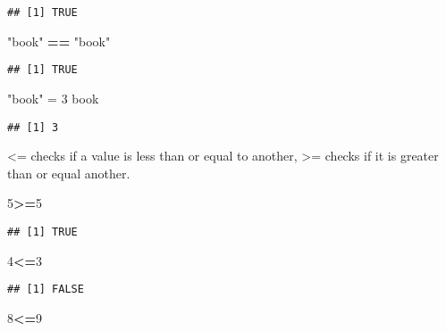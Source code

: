 \documentclass[
]{article}
\newenvironment{Shaded}{\begin{snugshade}}{\end{snugshade}}
\newcommand{\DecValTok}[1]{\textcolor[rgb]{0.00,0.00,0.81}{#1}}
\newcommand{\NormalTok}[1]{#1}
\newcommand{\OperatorTok}[1]{\textcolor[rgb]{0.81,0.36,0.00}{\textbf{#1}}}
\newcommand{\StringTok}[1]{\textcolor[rgb]{0.31,0.60,0.02}{#1}}
\begin{document}
\begin{verbatim}
## [1] TRUE
\end{verbatim}

\begin{Shaded}
\begin{Highlighting}[]
\StringTok{"book"} \OperatorTok{==}\StringTok{ "book"}
\end{Highlighting}
\end{Shaded}

\begin{verbatim}
## [1] TRUE
\end{verbatim}

\begin{Shaded}
\begin{Highlighting}[]
\StringTok{"book"}\NormalTok{ =}\StringTok{ }\DecValTok{3}
\NormalTok{book}
\end{Highlighting}
\end{Shaded}

\begin{verbatim}
## [1] 3
\end{verbatim}

\textless= checks if a value is less than or equal to another,
\textgreater= checks if it is greater than or equal another.

\begin{Shaded}
\begin{Highlighting}[]
\DecValTok{5}\OperatorTok{>=}\DecValTok{5}
\end{Highlighting}
\end{Shaded}

\begin{verbatim}
## [1] TRUE
\end{verbatim}

\begin{Shaded}
\begin{Highlighting}[]
\DecValTok{4}\OperatorTok{<=}\DecValTok{3}
\end{Highlighting}
\end{Shaded}

\begin{verbatim}
## [1] FALSE
\end{verbatim}

\begin{Shaded}
\begin{Highlighting}[]
\DecValTok{8}\OperatorTok{<=}\DecValTok{9}
\end{Highlighting}
\end{Shaded}
\end{document}
